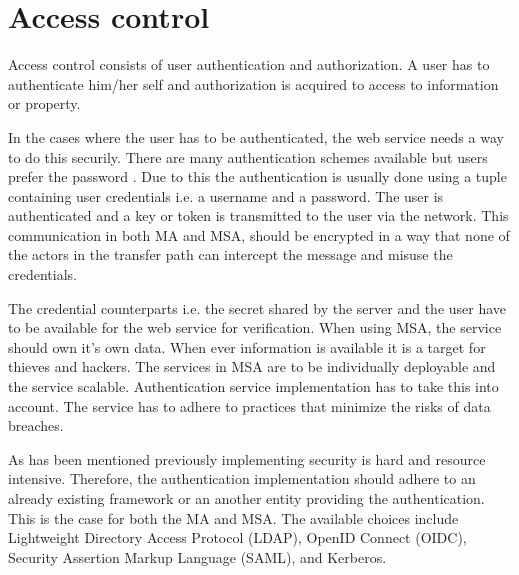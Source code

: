 \section{Access control}
\begin{sloppypar}
    Access control consists of user authentication and authorization. A user has to 
    authenticate him/her self and authorization is acquired to access to 
    information or property.
\end{sloppypar}
\begin{sloppypar}
    In the cases where the user has to be authenticated, the web service needs 
    a way to do this securily. There are many authentication schemes available 
    but users prefer the password \citep{passwordisdead}. Due to this the 
    authentication is usually done using a tuple containing user credentials 
    i.e. a username and a password. The user is authenticated and a key or 
    token is transmitted to the user via the network. This communication in 
    both MA and MSA, should be encrypted in a way that none of the actors in 
    the transfer path can intercept the message and misuse the credentials. 
\end{sloppypar}
\begin{sloppypar}
    The credential counterparts i.e. the secret shared by the server and the 
    user have to be available for the web service for verification. When using 
    MSA, the service should own it's own data. When ever information is 
    available it is a target for thieves and hackers. The services in MSA are 
    to be individually deployable and the service scalable. Authentication 
    service implementation has to take this into account. The service has to 
    adhere to practices that minimize the risks of data breaches. 
\end{sloppypar}
\begin{sloppypar}
    As has been mentioned previously implementing security is hard and resource 
    intensive. Therefore, the authentication implementation should adhere to an 
    already existing framework or an another entity providing the 
    authentication. This is the case for both the MA and MSA. The available 
    choices include Lightweight Directory Access Protocol (LDAP), OpenID 
    Connect (OIDC), Security Assertion Markup Language (SAML), and Kerberos.
\end{sloppypar}

